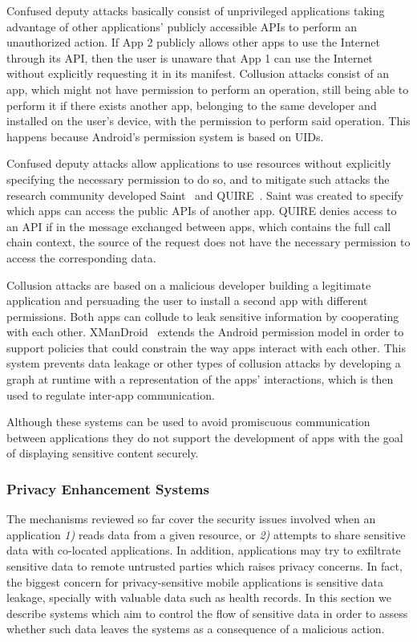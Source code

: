 Confused deputy attacks basically consist of unprivileged applications taking advantage of other applications’ publicly accessible APIs to perform an unauthorized action. If App 2 publicly allows other apps to use the Internet through its API, then the user is unaware that App 1 can use the Internet without explicitly requesting it in its manifest. Collusion attacks consist of an app, which might not have permission to perform an operation, still being able to perform it if there exists another app, belonging to the same developer and installed on the user’s device, with the permission to perform said operation. This happens because Android’s permission system is based on UIDs.

Confused deputy attacks allow applications to use resources without explicitly specifying the necessary permission to do so, and to mitigate such attacks the research community developed Saint~\cite{ongtang2012semantically} and QUIRE~\cite{dietz2011quire}. Saint was created to specify which apps can access the public APIs of another app. QUIRE denies access to an API if in the message exchanged between apps, which contains the full call chain context, the source of the request does not have the necessary permission to access the corresponding data.

Collusion attacks are based on a malicious developer building a legitimate application and persuading the user to install a second app with different permissions. Both apps can collude to leak sensitive information by cooperating with each other. XManDroid~\cite{bugiel2011xmandroid} extends the Android permission model in order to support policies that could constrain the way apps interact with each other. This system prevents data leakage or other types of collusion attacks by developing a graph at runtime with a representation of the apps’ interactions, which is then used to regulate inter-app communication.

Although these systems can be used to avoid promiscuous communication between applications they do not support the development of apps with the goal of displaying sensitive content securely.

\subsubsection{Privacy Enhancement Systems}

The mechanisms reviewed so far cover the security issues involved when an application \emph{1)} reads data from a given resource, or \emph{2)} attempts to share sensitive data with co-located applications. In addition, applications may try to exfiltrate sensitive data to remote untrusted parties which raises privacy concerns. In fact, the biggest concern for privacy-sensitive mobile applications is sensitive data leakage, specially with valuable data such as health records. In this section we describe systems which aim to control the flow of sensitive data in order to assess whether such data leaves the systems as a consequence of a malicious action.

